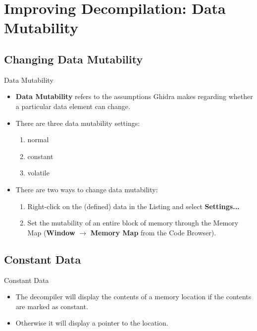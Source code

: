 \documentclass{beamer}
\begin{document}
\section{Improving Decompilation: Data Mutability}

\subsection{Changing Data Mutability}

\begin{frame}
\begin{block}{Data Mutability}
\begin{itemize}
\item \textbf{Data Mutability} refers to the assumptions Ghidra makes regarding whether a particular data element can change.
\item There are three data mutability settings:
\begin{enumerate}
\item normal
\item constant
\item volatile
\end{enumerate}
\item There are two ways to change data mutability:
\begin{enumerate}
\item Right-click on the (defined) data in the Listing and select \textbf{Settings...}
\item Set the mutability of an entire block of memory through the Memory Map (\textbf{Window} $\rightarrow$ \textbf{Memory Map} from the Code Browser).
\end{enumerate}
\end{itemize}
\end{block}
\end{frame}

\subsection{Constant Data}

\begin{frame}
\begin{block}{Constant Data}
\begin{itemize}
\item The decompiler will display the contents of a memory location if the contents are marked as constant.
\item Otherwise it will display a pointer to the location.
\end{itemize}
\end{block}
\end{frame}
\end{document}
